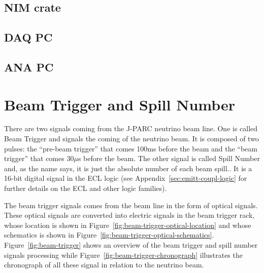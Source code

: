 \subsection{NIM crate}

\subsection{DAQ PC}

\subsection{ANA PC}

\section{Beam Trigger and Spill Number}\label{sec:beam-trigger-spill}
There are two signals coming from the J-PARC neutrino beam line. One is called
Beam Trigger and signals the coming of the neutrino beam. It is composed of two
pulses: the ``pre-beam trigger'' that comes 100ms before the beam and the ``beam
trigger'' that comes 30$\mu$s before the beam. The other signal is called Spill
Number and, as the name says, it is just the absolute number of each beam
spill.. It is a 16-bit digital signal in the ECL logic (see
Appendix~\ref{sec:emitt-coupl-logic} for further details on the ECL and other
logic families).

The beam trigger signals comes from the beam line in the form of optical
signals. These optical signals are converted into electric signals in the beam
trigger rack, whose location is shown in
Figure~\ref{fig:beam-trigger-optical-location} and whose schematics is shown in
Figure~\ref{fig:beam-trigger-optical-schematics}. Figure~\ref{fig:beam-trigger}
shows an overview of the beam trigger and spill number signals processing while
Figure~\ref{fig:beam-trigger-chronograph} illustrates the chronograph of all
these signal in relation to the neutrino beam.

